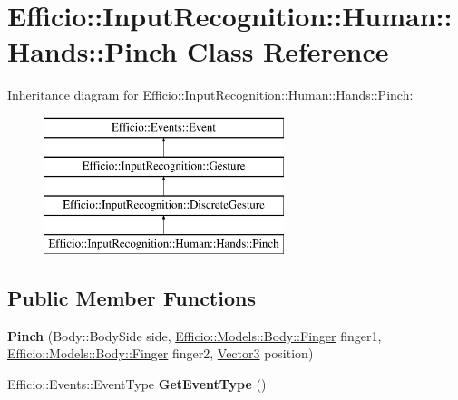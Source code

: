 \hypertarget{class_efficio_1_1_input_recognition_1_1_human_1_1_hands_1_1_pinch}{}\section{Efficio\+:\+:Input\+Recognition\+:\+:Human\+:\+:Hands\+:\+:Pinch Class Reference}
\label{class_efficio_1_1_input_recognition_1_1_human_1_1_hands_1_1_pinch}
Inheritance diagram for Efficio\+:\+:Input\+Recognition\+:\+:Human\+:\+:Hands\+:\+:Pinch\+:\begin{figure}[H]
\begin{center}
\leavevmode
\includegraphics[height=4.000000cm]{class_efficio_1_1_input_recognition_1_1_human_1_1_hands_1_1_pinch}
\end{center}
\end{figure}
\subsection*{Public Member Functions}
\begin{DoxyCompactItemize}
\item 
{\bfseries Pinch} (Body\+::\+Body\+Side side, \hyperlink{class_efficio_1_1_models_1_1_body_1_1_finger}{Efficio\+::\+Models\+::\+Body\+::\+Finger} finger1, \hyperlink{class_efficio_1_1_models_1_1_body_1_1_finger}{Efficio\+::\+Models\+::\+Body\+::\+Finger} finger2, \hyperlink{class_efficio_1_1_vector3}{Vector3} position)\hypertarget{class_efficio_1_1_input_recognition_1_1_human_1_1_hands_1_1_pinch_a51dfce3395e40ff8d9c29e04b636ff92}{}\label{class_efficio_1_1_input_recognition_1_1_human_1_1_hands_1_1_pinch_a51dfce3395e40ff8d9c29e04b636ff92}

\item 
Efficio\+::\+Events\+::\+Event\+Type {\bfseries Get\+Event\+Type} ()\hypertarget{class_efficio_1_1_input_recognition_1_1_human_1_1_hands_1_1_pinch_a579897e092310066f9dab8df222fc863}{}\label{class_efficio_1_1_input_recognition_1_1_human_1_1_hands_1_1_pinch_a579897e092310066f9dab8df222fc863}

\end{DoxyCompactItemize}
